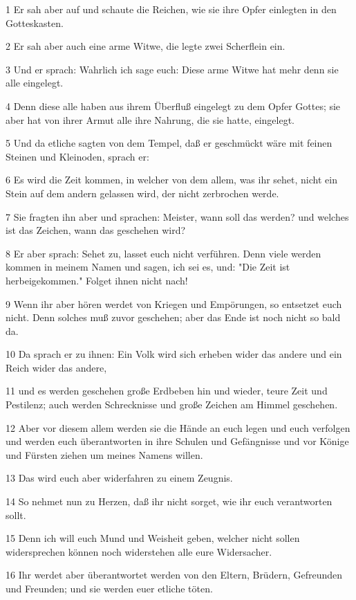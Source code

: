 \par 1 Er sah aber auf und schaute die Reichen, wie sie ihre Opfer einlegten in den Gotteskasten.
\par 2 Er sah aber auch eine arme Witwe, die legte zwei Scherflein ein.
\par 3 Und er sprach: Wahrlich ich sage euch: Diese arme Witwe hat mehr denn sie alle eingelegt.
\par 4 Denn diese alle haben aus ihrem Überfluß eingelegt zu dem Opfer Gottes; sie aber hat von ihrer Armut alle ihre Nahrung, die sie hatte, eingelegt.
\par 5 Und da etliche sagten von dem Tempel, daß er geschmückt wäre mit feinen Steinen und Kleinoden, sprach er:
\par 6 Es wird die Zeit kommen, in welcher von dem allem, was ihr sehet, nicht ein Stein auf dem andern gelassen wird, der nicht zerbrochen werde.
\par 7 Sie fragten ihn aber und sprachen: Meister, wann soll das werden? und welches ist das Zeichen, wann das geschehen wird?
\par 8 Er aber sprach: Sehet zu, lasset euch nicht verführen. Denn viele werden kommen in meinem Namen und sagen, ich sei es, und: "Die Zeit ist herbeigekommen." Folget ihnen nicht nach!
\par 9 Wenn ihr aber hören werdet von Kriegen und Empörungen, so entsetzet euch nicht. Denn solches muß zuvor geschehen; aber das Ende ist noch nicht so bald da.
\par 10 Da sprach er zu ihnen: Ein Volk wird sich erheben wider das andere und ein Reich wider das andere,
\par 11 und es werden geschehen große Erdbeben hin und wieder, teure Zeit und Pestilenz; auch werden Schrecknisse und große Zeichen am Himmel geschehen.
\par 12 Aber vor diesem allem werden sie die Hände an euch legen und euch verfolgen und werden euch überantworten in ihre Schulen und Gefängnisse und vor Könige und Fürsten ziehen um meines Namens willen.
\par 13 Das wird euch aber widerfahren zu einem Zeugnis.
\par 14 So nehmet nun zu Herzen, daß ihr nicht sorget, wie ihr euch verantworten sollt.
\par 15 Denn ich will euch Mund und Weisheit geben, welcher nicht sollen widersprechen können noch widerstehen alle eure Widersacher.
\par 16 Ihr werdet aber überantwortet werden von den Eltern, Brüdern, Gefreunden und Freunden; und sie werden euer etliche töten.
